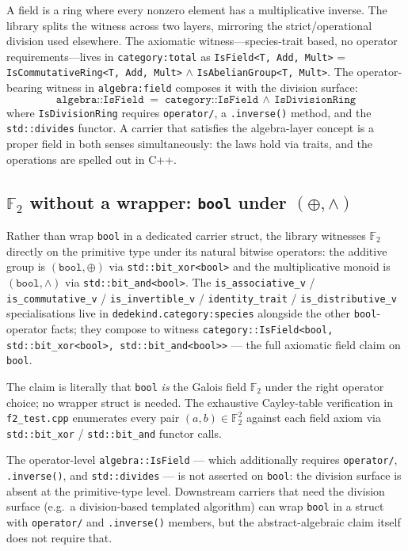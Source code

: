 \documentclass[11pt, a4paper]{report}
\begin{document}
A field is a ring where every nonzero element has a multiplicative inverse. The library splits the witness across two layers, mirroring the strict/operational division used elsewhere. The axiomatic witness---species-trait based, no operator requirements---lives in \texttt{category:total} as \texttt{IsField<T, Add, Mult>} = \texttt{IsCommutativeRing<T, Add, Mult>} $\wedge$ \texttt{IsAbelianGroup<T, Mult>}. The operator-bearing witness in \texttt{algebra:field} composes it with the division surface:
\[
  \texttt{algebra::IsField} \;=\; \texttt{category::IsField} \,\wedge\, \texttt{IsDivisionRing}
\]
where \texttt{IsDivisionRing} requires \texttt{operator/}, a \texttt{.inverse()} method, and the \texttt{std::divides} functor. A carrier that satisfies the algebra-layer concept is a proper field in both senses simultaneously: the laws hold via traits, and the operations are spelled out in C++.

\subsection{\texorpdfstring{$\mathbb{F}_2$}{F2} without a wrapper: \texttt{bool} under $(\oplus, \wedge)$}

Rather than wrap \texttt{bool} in a dedicated carrier struct, the library witnesses $\mathbb{F}_2$ directly on the primitive type under its natural bitwise operators: the additive group is $(\texttt{bool}, \oplus)$ via \texttt{std::bit\_xor<bool>} and the multiplicative monoid is $(\texttt{bool}, \wedge)$ via \texttt{std::bit\_and<bool>}. The \texttt{is\_associative\_v} / \texttt{is\_commutative\_v} / \texttt{is\_invertible\_v} / \texttt{identity\_trait} / \texttt{is\_distributive\_v} specialisations live in \texttt{dedekind.category:species} alongside the other \texttt{bool}-operator facts; they compose to witness \texttt{category::IsField<bool, std::bit\_xor<bool>, std::bit\_and<bool>>} --- the full axiomatic field claim on \texttt{bool}.

The claim is literally that \texttt{bool} \emph{is} the Galois field $\mathbb{F}_2$ under the right operator choice; no wrapper struct is needed. The exhaustive Cayley-table verification in \texttt{f2\_test.cpp} enumerates every pair $(a, b) \in \mathbb{F}_2^2$ against each field axiom via \texttt{std::bit\_xor} / \texttt{std::bit\_and} functor calls.

The operator-level \texttt{algebra::IsField} --- which additionally requires \texttt{operator/}, \texttt{.inverse()}, and \texttt{std::divides} --- is not asserted on \texttt{bool}: the division surface is absent at the primitive-type level. Downstream carriers that need the division surface (e.g.\ a division-based templated algorithm) can wrap \texttt{bool} in a struct with \texttt{operator/} and \texttt{.inverse()} members, but the abstract-algebraic claim itself does not require that.
\end{document}
